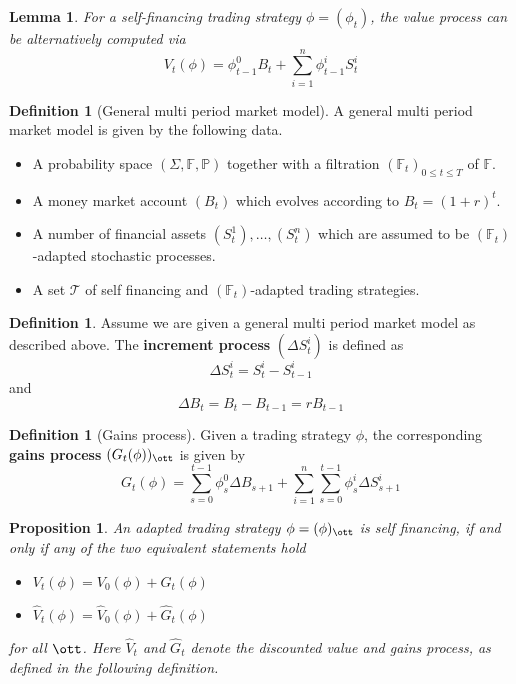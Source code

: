 \documentclass[10pt, oneside, reqno]{amsart}
\theoremstyle{plain}%
\newtheorem{lem}[thm]{Lemma}
\newtheorem{prop}[thm]{Proposition}
\theoremstyle{definition}
\newtheorem{defn}[thm]{Definition}
\theoremstyle{remark}
\newcommand{\F}{\mathbb{F}}
\newcommand{\sumni}{\sum_{i=1}^n}
\begin{document}
\begin{lem}
    For a self-financing trading strategy $\phi = (\phi_t)$, the value process can be alternatively computed via \[
        V_t(\phi) = \phi_{t-1}^0 B_t + \sumni \phi^i_{t-1} S^i_t
    \]
\end{lem}


\begin{defn}[General multi period market model]
        A general multi period market model is given by the following data.
        \begin{itemize}
            \item A probability space $(\Sigma, \F, \mathbb{P})$ together with a filtration $(\F_t)_{0 \leq t \leq T}$ of $\F$.
            \item A money market account $(B_t)$ which evolves according to $B_t = (1 +r)^t$.
            \item A number of financial assets $(S^1_t), \dots, (S^n_t)$ which are assumed to be $(\F_t)$-adapted stochastic processes.  
            \item A set $\mathcal{T}$ of self financing and $(\F_t)$-adapted trading strategies. 
        \end{itemize}
\end{defn}


\begin{defn}
        Assume we are given a general multi period market model as described above.  The \textbf{increment process} $(\Delta S^i_{t})$ is defined as \[
            \Delta S_t^i = S^i_t - S^i_{t-1}
        \]
        and \[
            \Delta B_t = B_t - B_{t-1} =  r B_{t-1} 
        \]
\end{defn}

\begin{defn}[Gains process]
    Given a trading strategy $\phi$, the corresponding \textbf{gains process} $(G_t(\phi))_{\ott}$ is given by \[
        G_t(\phi) = \sum_{s=0}^{t-1} \phi_s^0 \Delta B_{s+1} + \sumni \sum_{s=0}^{t-1} \phi_s^i \Delta S^i_{s+1}
    \]
\end{defn} 

\begin{prop}
    An adapted trading strategy $\phi = (\phi)_{\ott}$ is self financing, if and only if any of the two equivalent statements hold 
    \begin{itemize}
        \item $V_t(\phi) = V_0(\phi) + G_t(\phi)$
        \item $\hat{V}_t(\phi) = \hat{V}_0(\phi) + \hat{G}_t(\phi)$
    \end{itemize}
    for all $\ott$.  Here $\hat{V}_t$ and $\hat{G}_t$ denote the discounted value and gains process, as defined in the following definition.
\end{prop}
\end{document}
